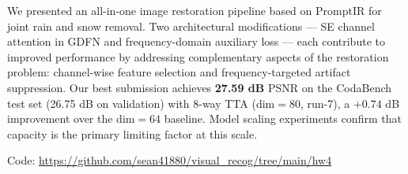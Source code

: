 \documentclass[runningheads]{llncs}
\begin{document}
We presented an all-in-one image restoration pipeline based on PromptIR
for joint rain and snow removal. Two architectural modifications ---
SE channel attention in GDFN and frequency-domain auxiliary loss --- each
contribute to improved performance by addressing complementary aspects
of the restoration problem: channel-wise feature selection and
frequency-targeted artifact suppression. Our best submission achieves \textbf{27.59 dB} PSNR on the CodaBench test
set (26.75 dB on validation) with 8-way TTA (dim$=80$, run-7), a $+0.74$ dB
improvement over the dim$=64$ baseline. Model scaling experiments confirm
that capacity is the primary limiting factor at this scale.

Code: \url{https://github.com/sean41880/visual_recog/tree/main/hw4}



\end{document}

